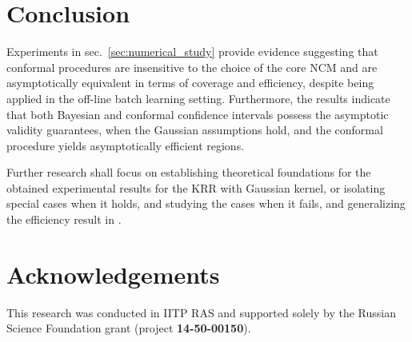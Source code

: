 \documentclass[conference]{IEEEtran}
\begin{document}

\section{Conclusion} %
\label{sec:conclusion}

Experiments in sec.~\ref{sec:numerical_study} provide evidence suggesting that
conformal procedures are insensitive to the choice of the core NCM and are asymptotically
equivalent in terms of coverage and efficiency, despite being applied in the off-line
batch learning setting. Furthermore, the results indicate that both Bayesian and
conformal confidence intervals possess the asymptotic validity guarantees, when
the Gaussian assumptions hold, and the conformal procedure yields asymptotically
efficient regions.

Further research shall focus on establishing theoretical foundations for the obtained
experimental results for the KRR with Gaussian kernel, or isolating special cases
when it holds, and studying the cases when it fails, and generalizing the efficiency
result in \cite{burnaevV14}.


\section*{Acknowledgements} %
\label{sec:acknowledgements}
\noindent This research was conducted in IITP RAS and supported solely by the Russian
Science Foundation grant (project \textbf{14-50-00150}).




\end{document}

